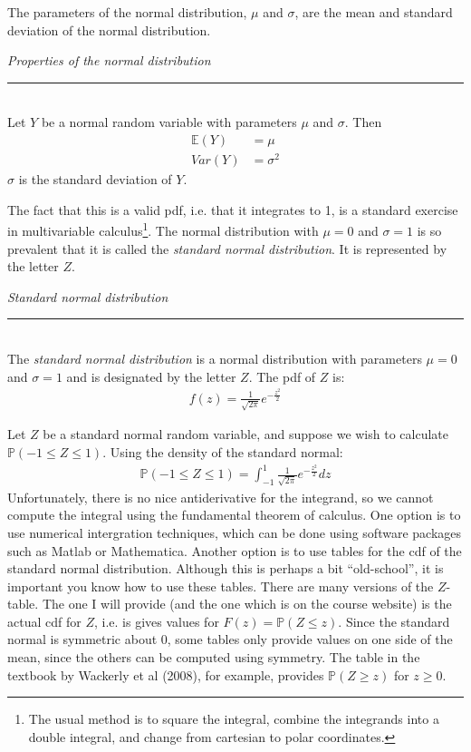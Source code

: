 \documentclass[12pt]{article}
\theoremstyle{definition}
\theoremstyle{remark}
\def\P{{\mathbb P}}
\def\E{{\mathbb E}}
\begin{document}
The parameters of the normal distribution, $\mu$ and $\sigma$, are the mean and standard deviation of the normal distribution.

\begin{framed}
\emph{Properties of the normal distribution}\\
  \rule{\dimexpr{}\fboxrule}{.1pt} \\
Let $Y$ be a normal random variable with parameters $\mu$ and $\sigma$. Then
\begin{align*}
\E(Y) &= \mu \\
Var(Y) &= \sigma^2
\end{align*}
$\sigma$ is the standard deviation of $Y$.
\end{framed}

The fact that this is a valid pdf, i.e. that it integrates to 1, is a standard exercise in multivariable calculus\footnote{The usual method is to square the integral, combine the integrands into a double integral, and change from cartesian to polar coordinates.}. The normal distribution with $\mu = 0$ and $\sigma = 1$ is so prevalent that it is called the \emph{standard normal distribution}. It is represented by the letter $Z$. 

\begin{framed}
\emph{Standard normal distribution}\\
  \rule{\dimexpr{}\fboxrule}{.1pt} \\
The \emph{standard normal distribution} is a normal distribution with parameters $\mu = 0$ and $\sigma = 1$ and is designated by the letter $Z$. The pdf of $Z$ is:
\begin{align*}
f(z) = \frac{1}{\sqrt{2 \pi}} e^{-\frac{z^2}{2}}
\end{align*}
\end{framed}

Let $Z$ be a standard normal random variable, and suppose we wish to calculate $\P(-1 \leq Z \leq 1)$. Using the density of the standard normal:
\begin{align*}
\P(-1 \leq Z \leq 1) = \int_{-1}^1 \frac{1}{\sqrt{2 \pi}} e^{-\frac{z^2}{2}} dz
\end{align*} 
Unfortunately, there is no nice antiderivative for the integrand, so we cannot compute the integral using the fundamental theorem of calculus. One option is to use numerical intergration techniques, which can be done using software packages such as Matlab or Mathematica. Another option is to use tables for the cdf of the standard normal distribution. Although this is perhaps a bit ``old-school'', it is important you know how to use these tables. There are many versions of the $Z$-table. The one I will provide (and the one which is on the course website) is the actual cdf for $Z$, i.e. is gives values for $F(z) = \P(Z \leq z)$. Since the standard normal is symmetric about 0, some tables only provide values on one side of the mean, since the others can be computed using symmetry. The table in the textbook by Wackerly et al (2008), for example, provides $\P(Z \geq z)$ for $z \geq 0$.\\
\end{document}
